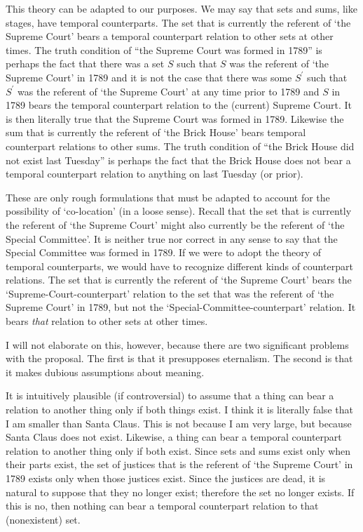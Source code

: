 \documentclass[11pt]{article}
\begin{document}
\begin{spacing}{1.5}
This theory can be adapted to our purposes.  We may say that sets and
sums, like stages, have temporal counterparts.  The set that is
currently the referent of `the Supreme Court' bears a temporal
counterpart relation to other sets at other times.  The truth
condition of ``the Supreme Court was formed in 1789'' is perhaps the
fact that there was a set $S$ such that $S$ was the referent of `the
Supreme Court' in 1789 and it is not the case that there was some
$S^{\prime}$ such that $S^{\prime}$ was the referent of `the Supreme
Court' at any time prior to 1789 and $S$ in 1789 bears the temporal
counterpart relation to the (current) Supreme Court.  It is then
literally true that the Supreme Court was formed in 1789.  Likewise
the sum that is currently the referent of `the Brick House' bears
temporal counterpart relations to other sums.  The truth condition of
``the Brick House did not exist last Tuesday'' is perhaps the fact
that the Brick House does not bear a temporal counterpart relation to
anything on last Tuesday (or prior).

These are only rough formulations that must be adapted to account for
the possibility of `co-location' (in a loose sense).  Recall that the
set that is currently the referent of `the Supreme Court' might also
currently be the referent of `the Special Committee'.  It is neither
true nor correct in any sense to say that the Special Committee was
formed in 1789.  If we were to adopt the theory of temporal
counterparts, we would have to recognize different kinds of
counterpart relations.  The set that is currently the referent of `the
Supreme Court' bears the `Supreme-Court-counterpart' relation to the
set that was the referent of `the Supreme Court' in 1789, but not the
`Special-Committee-counterpart' relation.  It bears {\em that}
relation to other sets at other times.

I will not elaborate on this, however, because there are two
significant problems with the proposal.  The first is that it
presupposes eternalism.  The second is that it makes dubious
assumptions about meaning.

It is intuitively plausible (if controversial) to assume that a thing
can bear a relation to another thing only if both things exist.  I
think it is literally false that I am smaller than Santa Claus.  This
is not because I am very large, but because Santa Claus does not
exist.  Likewise, a thing can bear a temporal counterpart relation to
another thing only if both exist.  Since sets and sums exist only when
their parts exist, the set of justices that is the referent of `the
Supreme Court' in 1789 exists only when those justices exist.  Since
the justices are dead, it is natural to suppose that they no longer
exist; therefore the set no longer exists.  If this is no, then
nothing can bear a temporal counterpart relation to that (nonexistent)
set.


\end{spacing}
\end{document}
